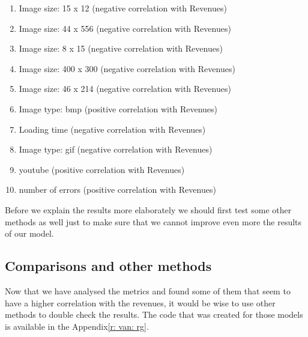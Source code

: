 \documentclass{book}
\begin{document}
\begin{enumerate}
\item Image size: 15 x 12 (negative correlation with Revenues)
\item Image size: 44 x 556 (negative correlation with Revenues)
\item Image size: 8 x 15 (negative correlation with Revenues)
\item Image size: 400 x 300 (negative correlation with Revenues)
\item Image size: 46 x 214 (negative correlation with Revenues)
\item Image type: bmp (positive correlation with Revenues)
\item Loading time (negative correlation with Revenues)
\item Image type: gif (negative correlation with Revenues)
\item youtube (positive correlation with Revenues)
\item number of errors (positive correlation with Revenues) 
\end{enumerate}
Before we explain the results more elaborately we should first test some other methods as well just to make sure that we cannot improve even more the results of our model.
\subsection{Comparisons and other methods}
Now that we have analysed the metrics and found some of them that seem to have a higher correlation with the revenues, it would be wise to use other methods to double check the results. The code that was created for those models is available in the Appendix\ref{r: van: rg}.
\end{document}
